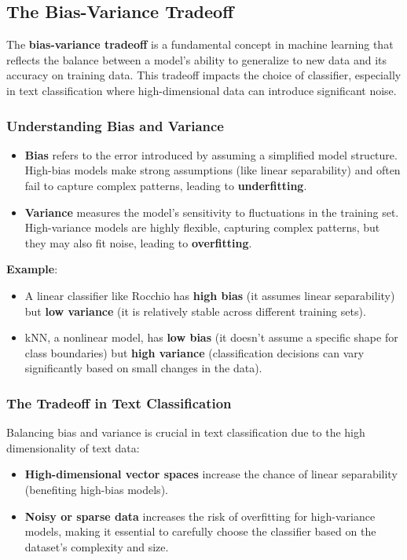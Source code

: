 \documentclass{article}
\begin{document}
\subsection{The Bias-Variance Tradeoff}

The \textbf{bias-variance tradeoff} is a fundamental concept in machine learning that reflects the balance between a model’s ability to generalize to new data and its accuracy on training data. This tradeoff impacts the choice of classifier, especially in text classification where high-dimensional data can introduce significant noise.

\subsubsection*{Understanding Bias and Variance}
\begin{itemize}
    \item \textbf{Bias} refers to the error introduced by assuming a simplified model structure. High-bias models make strong assumptions (like linear separability) and often fail to capture complex patterns, leading to \textbf{underfitting}.
    \item \textbf{Variance} measures the model’s sensitivity to fluctuations in the training set. High-variance models are highly flexible, capturing complex patterns, but they may also fit noise, leading to \textbf{overfitting}.
\end{itemize}

\textbf{Example}:
\begin{itemize}
    \item A linear classifier like Rocchio has \textbf{high bias} (it assumes linear separability) but \textbf{low variance} (it is relatively stable across different training sets).
    \item kNN, a nonlinear model, has \textbf{low bias} (it doesn’t assume a specific shape for class boundaries) but \textbf{high variance} (classification decisions can vary significantly based on small changes in the data).
\end{itemize}

\subsubsection*{The Tradeoff in Text Classification}

Balancing bias and variance is crucial in text classification due to the high dimensionality of text data:
\begin{itemize}
    \item \textbf{High-dimensional vector spaces} increase the chance of linear separability (benefiting high-bias models).
    \item \textbf{Noisy or sparse data} increases the risk of overfitting for high-variance models, making it essential to carefully choose the classifier based on the dataset's complexity and size.
\end{itemize}
\end{document}

